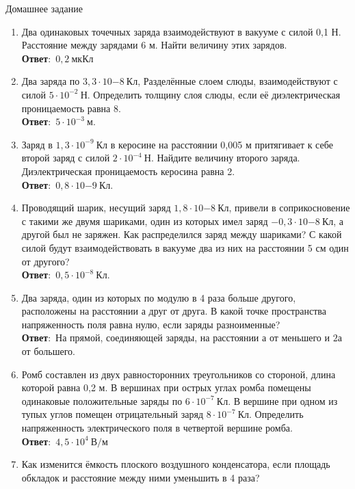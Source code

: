 \documentclass[a5paper, 10pt]{diss_4}
\renewcommand{\'}{\,'}
\begin{document}
\begin{center}
   Домашнее задание
\end{center}
\begin{enumerate}
\item Два одинаковых точечных заряда взаимодействуют в вакууме с силой 0,1 Н. Расстояние между зарядами 6 м. Найти величину этих зарядов.
\\\textbf{Ответ}:\ $0,2\ мкКл$
\item Два заряда по $3,3\cdot10{-8}\ Кл$, Разделённые слоем слюды, взаимодействуют с силой $5\cdot10^{-2}\ Н$. Определить толщину слоя слюды, если её диэлектрическая проницаемость равна 8.
\\\textbf{Ответ}:\ $5\cdot10^{-3}\ м$.
\item Заряд в $1,3\cdot10^{-9}\ Кл$ в керосине на расстоянии 0,005 м притягивает к себе второй заряд с силой $2\cdot10^{-4}\ Н$. Найдите величину второго заряда. Диэлектрическая проницаемость керосина равна 2.
\\\textbf{Ответ}:\ $0,8\cdot10{-9}\ Кл$.
\item Проводящий шарик, несущий заряд $1,8\cdot10{-8}\ Кл$, привели в соприкосновение с такими же двумя шариками, один из которых имел заряд $-0,3\cdot10{-8}\ Кл$, а другой был не заряжен. Как распределился заряд между шариками? С какой силой будут взаимодействовать в вакууме два из них на расстоянии 5 см один от другого?
\\\textbf{Ответ}:\ $0,5\cdot10^{-8}\ Кл$.
\item Два заряда, один из которых по модулю в 4 раза больше другого, расположены на расстоянии а друг от друга. В какой точке пространства напряженность поля равна нулю, если заряды разноименные?
\\\textbf{Ответ}:\  На прямой, соединяющей заряды, на расстоянии $а$ от меньшего и $2а$ от большего.
\item Ромб составлен из двух равносторонних треугольников со стороной, длина которой равна 0,2 м. В вершинах при острых углах ромба помещены одинаковые положительные заряды по $6\cdot10^{-7}\ Кл$. В вершине при одном из тупых углов помещен отрицательный заряд $8\cdot10^{-7}\ Кл$. Определить напряженность электрического поля в четвертой вершине ромба.
\\\textbf{Ответ}:\ $4,5\cdot10^{4}\ В/м$
\item Как изменится ёмкость плоского воздушного конденсатора, если площадь обкладок и расстояние между ними уменьшить в 4 раза?
\end{enumerate}
\end{document}

